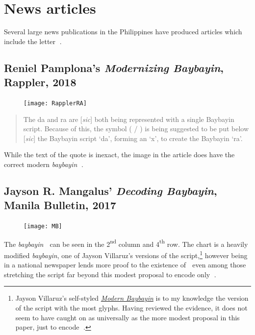 \documentclass[a4paper,pagesize,openany,14pt,parskip=never]{scrbook}
\newcommand{\≈}{$\approx$}
\begin{document}
\section{News articles}

Several large news publications in the Philippines have produced articles which include the letter {\baybayin ᜍ}.

\subsection{Reniel Pamplona's {\em Modernizing Baybayin}, Rappler, 2018}
\label{MB2018}

\begin{figure}[H]
\texttt{[image: RapplerRA]}
\end{figure}

\begin{quote}
    The da and ra are [{\em sic}] both being represented with a single Baybayin script. Because of this, the symbol ( / ) is being suggested to be put below [{\em sic}] the Baybayin script ‘da’, forming an ‘x’, to create the Baybayin ‘ra’.
\end{quote}

While the text of the quote is inexact, the image in the article does have the correct modern {\em baybayin} {\baybayin ᜍ}.

\subsection{Jayson R. Mangalus' {\em Decoding Baybayin}, Manila Bulletin, 2017}

\begin{figure}[H]
\texttt{[image: MB]}
\end{figure}

The {\em baybayin} {\baybayin ᜍ} can be seen in the 2{\textsuperscript{nd}} column and 4{\textsuperscript{th}} row. The chart is a heavily modified {\em baybayin}, one of Jayson Villaruz's versions of the script,\footnote{Jayson Villaruz's self-styled \href{http://modernbaybayin.blogspot.com/}{{\em Modern Baybayin}} is to my knowledge the version of the script with the most glyphs. Having reviewed the evidence, it does not seem to have caught on as universally as the more modest proposal in this paper, just to encode {\baybayin ᜍ}.} however being in a national newspaper lends more proof to the existence of {\baybayin ᜍ} even among those stretching the script far beyond this modest proposal to encode only {\baybayin ᜍ}.
\end{document}
